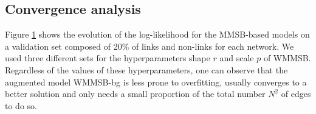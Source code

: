 
\begin{table}
\centering
	
\label{table:roc}
\end{table}

%
%
\subsection {Convergence analysis} %
Figure \ref{fig:conv_entropy} shows the evolution of the log-likelihood for the MMSB-based models on a validation set composed of 20\% of links and non-links for each network. We used three different sets for the hyperparameters shape $r$ and scale $p$ of WMMSB. Regardless of the values of these hyperparameters, one can observe that the augmented model WMMSB-bg is less prone to overfitting, usually converges to a better solution and only needs a small proportion of the total number $N^2$ of edges to do so.

\begin{figure}[h]
\centering
	
    \label{fig:conv_entropy}
\end{figure}

